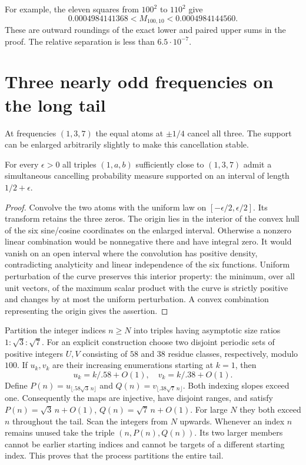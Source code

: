 \documentclass[11pt]{article}
\begin{document}
For example, the eleven squares from $100^2$ to $110^2$ give
\[
       0.0004984141368<M_{100,10}<0.0004984144560.
\]
These are outward roundings of the exact lower and paired upper sums in the proof. The relative separation is less than $6.5\cdot10^{-7}$.

\section{Three nearly odd frequencies on the long tail}
At frequencies $(1,3,7)$ the equal atoms at $\pm1/4$ cancel all three. The support can be enlarged arbitrarily slightly to make this cancellation stable.

\begin{lemma}\label{stable}
For every $\epsilon>0$ all triples $(1,a,b)$ sufficiently close to $(1,3,7)$ admit a simultaneous cancelling probability measure supported on an interval of length $1/2+\epsilon$.
\end{lemma}
\begin{proof}
Convolve the two atoms with the uniform law on $[-\epsilon/2,\epsilon/2]$. Its transform retains the three zeros. The origin lies in the interior of the convex hull of the six sine/cosine coordinates on the enlarged interval. Otherwise a nonzero linear combination would be nonnegative there and have integral zero. It would vanish on an open interval where the convolution has positive density, contradicting analyticity and linear independence of the six functions. Uniform perturbation of the curve preserves this interior property: the minimum, over all unit vectors, of the maximum scalar product with the curve is strictly positive and changes by at most the uniform perturbation. A convex combination representing the origin gives the assertion.
\end{proof}

Partition the integer indices $n\ge N$ into triples having asymptotic size ratios $1:\sqrt3:\sqrt7$. For an explicit construction choose two disjoint periodic sets of positive integers $U,V$ consisting of $58$ and $38$ residue classes, respectively, modulo $100$. If $u_k,v_k$ are their increasing enumerations starting at $k=1$, then
\[
 u_k=k/.58+O(1),\quad v_k=k/.38+O(1).
\]
Define $P(n)=u_{\lfloor .58\sqrt3\,n\rfloor}$ and $Q(n)=v_{\lfloor .38\sqrt7\,n\rfloor}$. Both indexing slopes exceed one. Consequently the maps are injective, have disjoint ranges, and satisfy $P(n)=\sqrt3\,n+O(1)$, $Q(n)=\sqrt7\,n+O(1)$. For large $N$ they both exceed $n$ throughout the tail. Scan the integers from $N$ upwards. Whenever an index $n$ remains unused take the triple $(n,P(n),Q(n))$. Its two larger members cannot be earlier starting indices and cannot be targets of a different starting index. This proves that the process partitions the entire tail.
\end{document}
